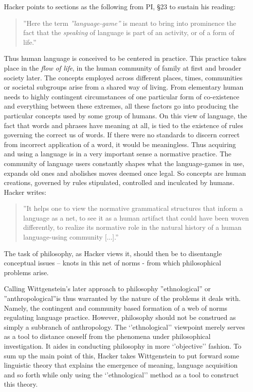 \documentclass{article}
\begin{document}
Hacker points to sections as the following from PI, §23 to sustain his reading:
\begin{quote}
''Here the term \textit{''language-game''} is meant to bring into prominence
the fact that the \textit{speaking} of language is part of an activity, or of a form
of life.''
\end{quote} %
Thus human language is conceived to be centered in practice. This practice takes place in the \textit{flow of life}, in the human community of family at first and broader society later. The concepts employed across different places, times, communities or societal subgroups arise from a shared way of living. From elementary human needs to highly contingent circumstances of one particular form of co-existence and everything between these extremes, all these factors go into producing the particular concepts used by some group of humans.
On this view of language, the fact that words and phrases have meaning at all, is tied to the existence of rules governing the correct us of words. If there were no standards to discern correct from incorrect application of a word, it would be meaningless. 
Thus acquiring and using a language is in a very important sense a normative practice. The community of language users constantly shapes what the language-games in use, expands old ones and abolishes moves deemed once legal.
So concepts are human creations, governed by rules stipulated, controlled and inculcated by humans. Hacker writes: \begin{quote}
''It helps one to view the normative grammatical structures that inform a language as a net, to see it as a human artifact that could have been woven differently, to realize its normative role in the natural history of a human language-using community [...].''
\end{quote}
The task of philosophy, as Hacker views it, should then be to disentangle conceptual issues – knots in this net of norms - from which philosophical problems arise.

 Calling Wittgenstein's later approach to philosophy ''ethnological'' or ''anthropological''is thus warranted by the nature of the problems it deals with. Namely, the contingent and community based formation of a web of norms regulating language practice. However, philosophy should not be construed as simply a subbranch of anthropology. The ‘’ethnological’’ viewpoint merely serves as a tool to distance oneself from the phenomena under philosophical investigation. It aides in conducting philosophy in more ‘’objective’’ fashion.
To sum up the main point of this, Hacker takes Wittgenstein to put forward some linguistic theory that explains the emergence of meaning, language acquisition and so forth while only using the ‘’ethnological’’ method as a tool to construct this theory.
\end{document}
